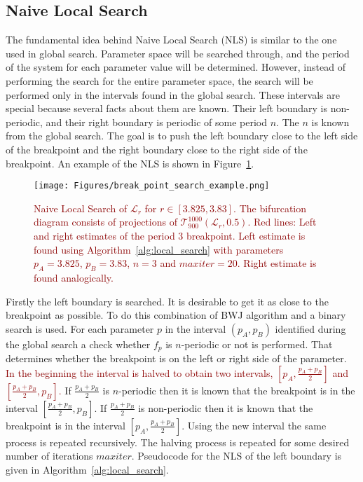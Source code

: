 \subsection{Naive Local Search}
\label{subsec:naive_local_search}
The fundamental idea behind Naive Local Search (NLS) is similar to the one used in global search.
Parameter space will be searched through, and the period of the system for each parameter value will be determined.
However, instead of performing the search for the entire parameter space, the search will be performed only in the intervals found in the global search.
These intervals are special because several facts about them are known.
Their left boundary is non-periodic, and their right boundary is periodic of some period $n$.
The $n$ is known from the global search.
The goal is to push the left boundary close to the left side of the breakpoint and the right boundary close to the right side of the breakpoint.
An example of the NLS is shown in Figure~\ref{fig:break_point_search_example}.

\begin{figure}[!h]
    \centering
    \texttt{[image: Figures/break\_point\_search\_example.png]}
    \caption{
        \textcolor{darkred}{
        Naive Local Search of $\mathcal{L}_{r}$ for $r \in [ 3.825, 3.83 ]$.
        The bifurcation diagram consists of projections of $\mathcal{T}_{900}^{1000}(\mathcal{L}_{r}, 0.5)$.
        Red lines: Left and right estimates of the period $3$ breakpoint.
        Left estimate is found using Algorithm~\ref{alg:local_search} with parameters $p_A = 3.825$, $p_B = 3.83$, $n = 3$ and $maxiter = 20$.
        Right estimate is found analogically.
        }
    }
    \label{fig:break_point_search_example}
\end{figure}



\par
Firstly the left boundary is searched.
It is desirable to get it as close to the breakpoint as possible.
To do this combination of BWJ algorithm and a binary search is used.
For each parameter $p$ in the interval $(p_{A}, p_{B})$ identified during the global search a check whether $f_{p}$ is $n$-periodic or not is performed.
That determines whether the breakpoint is on the left or right side of the parameter.
\textcolor{darkred}{In the beginning the interval is halved to obtain two intervals, $[p_{A}, \frac{p_{A}+p_{B}}{2}]$ and $[\frac{p_{A}+p_{B}}{2}, p_{B}]$.}
If $\frac{p_{A}+p_{B}}{2}$ is $n$-periodic then it is known that the breakpoint is in the interval $[\frac{p_{A}+p_{B}}{2}, p_{B}]$.
If $\frac{p_{A}+p_{B}}{2}$ is non-periodic then it is known that the breakpoint is in the interval $[p_{A}, \frac{p_{A}+p_{B}}{2}]$.
Using the new interval the same process is repeated recursively.
The halving process is repeated for some desired number of iterations $maxiter$.
Pseudocode for the NLS of the left boundary is given in Algorithm~\ref{alg:local_search}.

